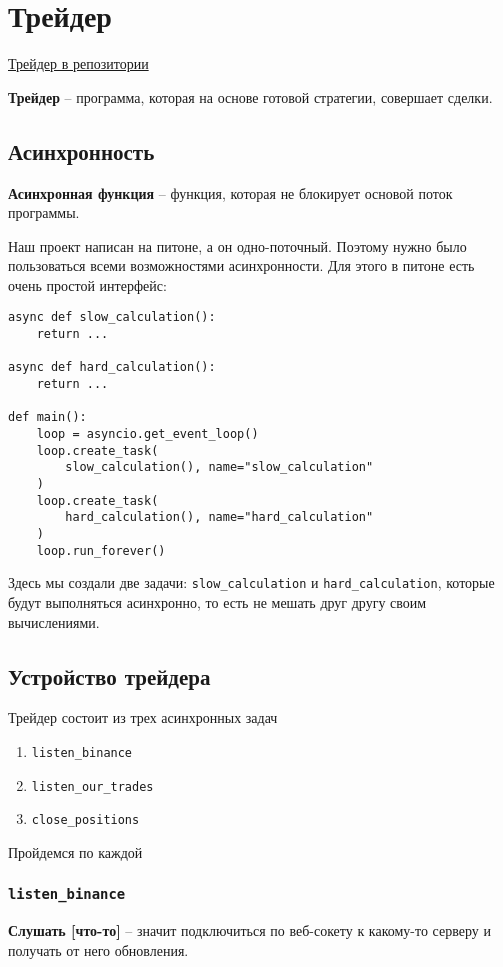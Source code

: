 \section{Трейдер}
\href{https://github.com/dexety/dex-trading-system/blob/main/strategy/arbitrage/trader.py}{Трейдер в репозитории}

 \textbf{Трейдер} -- программа, которая на основе готовой стратегии, совершает сделки.

\subsection{Асинхронность}

 \textbf{Асинхронная функция} -- функция, которая не блокирует основой поток программы.

Наш проект написан на питоне, а он одно-поточный. Поэтому нужно было пользоваться всеми возможностями асинхронности. Для этого в питоне есть очень простой интерфейс:

\begin{verbatim}
async def slow_calculation():
    return ...
    
async def hard_calculation():
    return ...
    
def main():
    loop = asyncio.get_event_loop()
    loop.create_task(
        slow_calculation(), name="slow_calculation"
    )
    loop.create_task(
        hard_calculation(), name="hard_calculation"
    )
    loop.run_forever()
\end{verbatim}

Здесь мы создали две задачи: \texttt{slow\_calculation} и  \texttt{hard\_calculation}, которые будут выполняться асинхронно, то есть не мешать друг другу своим вычислениями.


\subsection{Устройство трейдера}

Трейдер состоит из трех асинхронных задач

\begin{enumerate}
    \item \texttt{listen\_binance}
    \item \texttt{listen\_our\_trades}
    \item \texttt{close\_positions}
\end{enumerate}

Пройдемся по каждой

\subsubsection{\texttt{listen\_binance}}
 \textbf{Слушать [что-то]} -- значит подключиться по веб-сокету к какому-то серверу и получать от него обновления.

